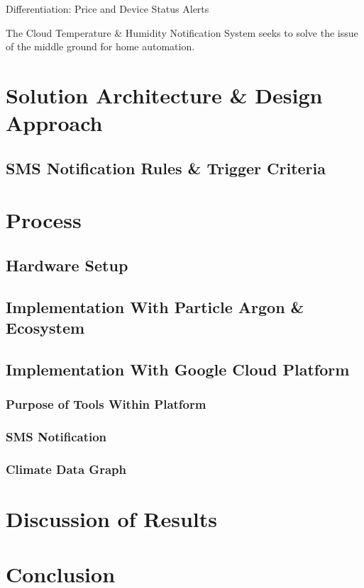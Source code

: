 \documentclass{article}
\begin{document}
Differentiation: Price and Device Status Alerts

The Cloud Temperature \& Humidity Notification System seeks to solve the issue of the middle ground for home automation.

\section{Solution Architecture \& Design Approach}
\subsection{SMS Notification Rules \& Trigger Criteria}
\section{Process}
\subsection{Hardware Setup}
\subsection{Implementation With Particle Argon \& Ecosystem}
\subsection{Implementation With Google Cloud Platform }
\subsubsection{Purpose of Tools Within Platform}
\subsubsection{SMS Notification}
\subsubsection{Climate Data Graph}




\section{Discussion of Results}

\section{Conclusion}
\end{document}
